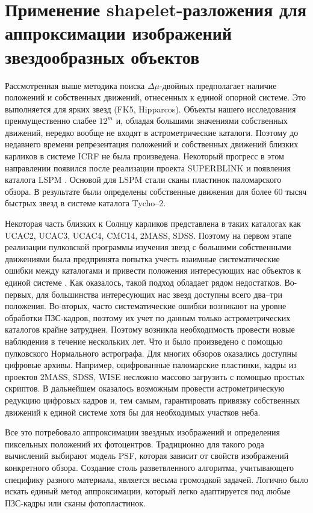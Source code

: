 \chapter{Применение shapelet-разложения для аппроксимации изображений звездообразных объектов} \label{ch:ch2}
Рассмотренная выше методика поиска $\Delta\mu$-двойных предполагает наличие положений и собственных движений, отнесенных к единой опорной системе. Это выполняется для ярких звезд (FK5, Hipparcos). Объекты нашего исследования преимущественно слабее $12^m$ и, обладая большими значениями собственных движений, нередко вообще не входят в астрометрические каталоги. Поэтому до недавнего времени репрезентация положений и собственных движений близких карликов в системе ICRF не была произведена. Некоторый прогресс в этом направлении появился после реализации проекта SUPERBLINK и появления каталога LSPM \cite{2005AJ....129.1483L}. Основой для LSPM стали сканы пластинок паломарского обзора. В результате были определены собственные движения для более 60 тысяч быстрых звезд в системе каталога Tycho--2.

Некоторая часть близких к Солнцу карликов представлена в таких каталогах как UCAC2, UCAC3, UCAC4, CMC14, 2MASS, SDSS. Поэтому на первом этапе реализации пулковской программы изучения звезд с большими собственными движениями была предпринята попытка учесть взаимные систематические ошибки между каталогами и привести положения интересующих нас объектов к единой системе \cite{2011AstL...37..420K}. Как оказалось, такой подход обладает рядом недостатков. Во-первых, для большинства интересующих нас звезд доступны всего два--три положения. Во-вторых, часто систематические ошибки возникают на уровне обработки ПЗС-кадров, поэтому их учет по данным только астрометрических каталогов крайне затруднен. Поэтому возникла необходимость провести новые наблюдения в течение нескольких лет. Что и было произведено с помощью пулковского Нормального астрографа. Для многих обзоров оказались доступны цифровые архивы. Например, оцифрованные паломарские пластинки, кадры из проектов 2MASS, SDSS, WISE несложно массово загрузить с помощью простых скриптов. В дальнейшем оказалось возможным провести астрометрическую редукцию цифровых кадров и, тем самым, гарантировать привязку собственных движений к единой системе хотя бы для необходимых участков неба.

Все это потребовало аппроксимации звездных изображений и определения пиксельных положений их фотоцентров. Традиционно для такого рода вычислений выбирают модель PSF, которая зависит от свойств изображений конкретного обзора. Создание столь разветвленного алгоритма, учитывающего специфику разного материала, является весьма громоздкой задачей. Логично было искать единый метод аппроксимации, который легко адаптируется под любые ПЗС-кадры или сканы фотопластинок.

